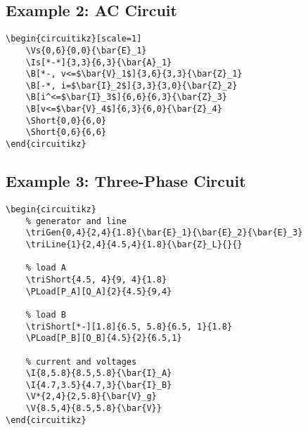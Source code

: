 \documentclass[a4paper,12pt]{article}
\begin{document}
\begin{center}
	\begin{circuitikz}[scale=1]
	\end{circuitikz}
\end{center}

\subsection{Example 2: AC Circuit}

\begin{lstlisting}[style=latexstyle]
\begin{circuitikz}[scale=1]
    \Vs{0,6}{0,0}{\bar{E}_1}
    \Is[*-*]{3,3}{6,3}{\bar{A}_1}
    \B[*-, v<=$\bar{V}_1$]{3,6}{3,3}{\bar{Z}_1}
    \B[-*, i=$\bar{I}_2$]{3,3}{3,0}{\bar{Z}_2}
    \B[i^<=$\bar{I}_3$]{6,6}{6,3}{\bar{Z}_3}
    \B[v<=$\bar{V}_4$]{6,3}{6,0}{\bar{Z}_4}
    \Short{0,0}{6,0}
    \Short{0,6}{6,6}
\end{circuitikz} 
\end{lstlisting}

\begin{center}
	\begin{circuitikz}[scale=1]
	\end{circuitikz}   
\end{center}

\subsection{Example 3: Three-Phase Circuit}

\begin{lstlisting}[style=latexstyle]
\begin{circuitikz}
    % generator and line
    \triGen{0,4}{2,4}{1.8}{\bar{E}_1}{\bar{E}_2}{\bar{E}_3}
    \triLine{1}{2,4}{4.5,4}{1.8}{\bar{Z}_L}{}{}

    % load A
    \triShort{4.5, 4}{9, 4}{1.8}
    \PLoad[P_A][Q_A]{2}{4.5}{9,4}
    
    % load B
    \triShort[*-][1.8]{6.5, 5.8}{6.5, 1}{1.8}
    \PLoad[P_B][Q_B]{4.5}{2}{6.5,1}

    % current and voltages
    \I{8,5.8}{8.5,5.8}{\bar{I}_A}
    \I{4.7,3.5}{4.7,3}{\bar{I}_B}
    \V*{2,4}{2,5.8}{\bar{V}_g}
    \V{8.5,4}{8.5,5.8}{\bar{V}}
\end{circuitikz}
\end{lstlisting}
\end{document}
